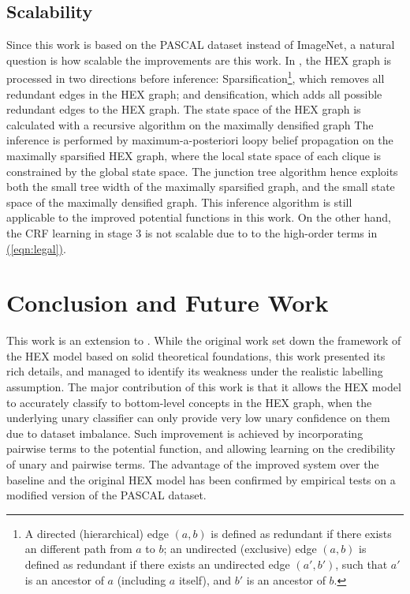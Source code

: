 \documentclass[11pt,a4paper]{article}
\begin{document}
\subsection{Scalability}
\label{sec:scale}

Since this work is based on the PASCAL dataset instead of ImageNet, a natural question is how scalable the improvements are this work. In \cite{deng2014large}, the HEX graph is processed in two directions before inference: Sparsification\footnote{A directed (hierarchical) edge $(a,b)$ is defined as redundant if there exists an different path from $a$ to $b$; an undirected (exclusive) edge $(a,b)$ is defined as redundant if there exists an undirected edge $(a',b')$, such that $a'$ is an ancestor of $a$ (including $a$ itself), and $b'$ is an ancestor of $b$.}, which removes all redundant edges in the HEX graph; and densification, which adds all possible redundant edges to the HEX graph. The state space of the HEX graph is calculated with a recursive algorithm on the maximally densified graph The inference is performed by maximum-a-posteriori loopy belief propagation on the maximally sparsified HEX graph, where the local state space of each clique is constrained by the global state space. The junction tree algorithm hence exploits both the small tree width of the maximally sparsified graph, and the small state space of the maximally densified graph. This inference algorithm is still applicable to the improved potential functions in this work. On the other hand, the CRF learning in stage 3 is not scalable due to to the high-order terms in \hyperref[eqn:legal]{(\ref{eqn:legal})}.

\section{Conclusion and Future Work}

This work is an extension to \cite{deng2014large}. While the original work set down the framework of the HEX model based on solid theoretical foundations, this work presented its rich details, and managed to identify its weakness under the realistic labelling assumption. The major contribution of this work is that it allows the HEX model to accurately classify to bottom-level concepts in the HEX graph, when the underlying unary classifier can only provide very low unary confidence on them due to dataset imbalance. Such improvement is achieved by incorporating pairwise terms to the potential function, and allowing learning on the credibility of unary and pairwise terms. The advantage of the improved system over the baseline and the original HEX model has been confirmed by empirical tests on a modified version of the PASCAL dataset.
\end{document}
